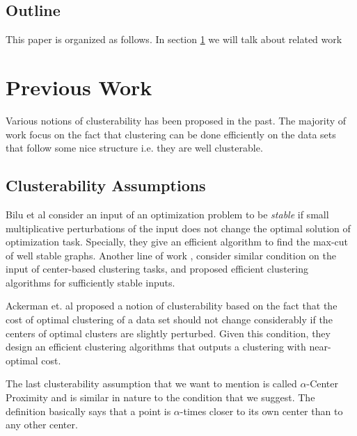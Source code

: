 \documentclass[twoside]{article}
\begin{document}
\subsection{Outline}
This paper is organized as follows. In section \ref{sec:previous} we will talk about related work
\section{Previous Work}
\label{sec:previous}

Various notions of clusterability has been proposed in the past. The majority of work focus on the fact that clustering can be done efficiently on the data sets that follow some nice structure i.e. they are well clusterable. 

\subsection{Clusterability Assumptions}


Bilu et al \cite{bilu2012stable} consider an input of an optimization problem to be \emph{stable} if small multiplicative perturbations of the input does not change the optimal solution of optimization task. Specially, they give an efficient algorithm to find the max-cut of well stable graphs.
Another line of work \cite{awasthi2012center, balcan2012clustering} , consider similar condition on the input of center-based clustering tasks, and proposed efficient clustering algorithms for sufficiently stable inputs.

Ackerman et. al \cite{ackerman2009clusterability} proposed a notion of clusterability based on the fact that the cost of optimal clustering of a data set should not change considerably if the centers of optimal clusters are slightly perturbed. Given this condition, they design an efficient clustering algorithms that outputs a clustering with near-optimal cost. 

The last clusterability assumption that we want to mention is called {$\alpha$-Center Proximity\cite{awasthi2012center}} and is similar in nature to the condition that we suggest. The definition basically says that a point is $\alpha$-times closer to its own center than to any other center. 
\end{document}
